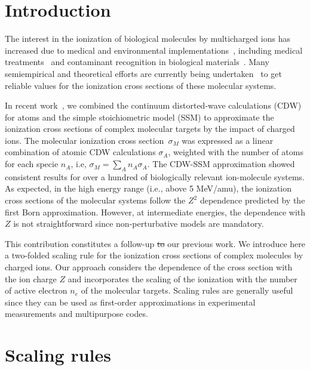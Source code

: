 \documentclass[10pt,showpacs,showkeys,twocolumn]{revtex4-1}
\providecommand{\DIFadd}[1]{{\protect\color{blue}\uwave{#1}}} %
\providecommand{\DIFdel}[1]{{\protect\color{red}\sout{#1}}}                      %
\providecommand{\DIFaddbegin}{} %
\providecommand{\DIFaddend}{} %
\providecommand{\DIFdelbegin}{} %
\providecommand{\DIFdelend}{} %
\newcommand{\DIFscaledelfig}{0.5}
\newlength{\DIFdelgraphicswidth} %
\newlength{\DIFdelgraphicsheight} %
\newcommand{\DIFaddincludegraphics}[2][]{{\color{blue}\fbox{\DIFOincludegraphics[#1]{#2}}}} %
\newcommand{\DIFdelincludegraphics}[2][]{%
\sbox{\DIFdelgraphicsbox}{\DIFOincludegraphics[#1]{#2}}%
\settoboxwidth{\DIFdelgraphicswidth}{\DIFdelgraphicsbox} %
\settoboxtotalheight{\DIFdelgraphicsheight}{\DIFdelgraphicsbox} %
\scalebox{\DIFscaledelfig}{%
\parbox[b]{\DIFdelgraphicswidth}{\usebox{\DIFdelgraphicsbox}\\[-\baselineskip] \rule{\DIFdelgraphicswidth}{0em}}\llap{\resizebox{\DIFdelgraphicswidth}{\DIFdelgraphicsheight}{%
\setlength{\unitlength}{\DIFdelgraphicswidth}%
\begin{picture}(1,1)%
\thicklines\linethickness{2pt} %
{\color[rgb]{1,0,0}\put(0,0){\framebox(1,1){}}}%
{\color[rgb]{1,0,0}\put(0,0){\line( 1,1){1}}}%
{\color[rgb]{1,0,0}\put(0,1){\line(1,-1){1}}}%
\end{picture}%
}\hspace*{3pt}}} %
} %
\DeclareRobustCommand{\DIFaddbegin}{\DIFOaddbegin \let\includegraphics\DIFaddincludegraphics} %
\DeclareRobustCommand{\DIFaddend}{\DIFOaddend \let\includegraphics\DIFOincludegraphics} %
\DeclareRobustCommand{\DIFdelbegin}{\DIFOdelbegin \let\includegraphics\DIFdelincludegraphics} %
\DeclareRobustCommand{\DIFdelend}{\DIFOaddend \let\includegraphics\DIFOincludegraphics} %
\begin{document}
\section{Introduction}

The interest in the ionization of biological molecules by 
multicharged ions has increased due to medical and environmental
implementations~\cite{PhysMed}, including medical 
treatments~\cite{Mohamad2017,Solov2009,Denifl2011} and contaminant 
recognition in biological materials~\cite{water,ferrazdias}. 
Many semiempirical \citep{vera_prl2013} and theoretical efforts are 
currently being undertaken~\cite{MendezJPB20,Quinto20,ludde2019,
ludde2018,ludde2016,Champion2012} to get reliable values for the 
ionization cross sections of these molecular systems. 

In recent work~\cite{MendezJPB20}, we combined the continuum 
distorted-wave calculations (CDW) for atoms and the simple 
stoichiometric model (SSM) to approximate the ionization cross 
sections of complex molecular targets by the impact of charged ions. 
The molecular ionization cross section~$\sigma_M$ was expressed as 
a linear combination of atomic CDW calculations $\sigma_A$, 
weighted with the number of atoms for each specie $n_A$, i.e, 
$\sigma_M=\sum_A n_A \sigma_A$. The CDW-SSM approximation showed 
consistent results for over a hundred of biologically relevant 
ion-molecule systems. As expected, in the high energy range (i.e., 
above 5 MeV/amu), the ionization cross sections of 
the molecular systems follow the $Z^2$ dependence predicted by the 
first Born approximation. However, at intermediate 
energies, the dependence with $Z$ is not straightforward since 
non-perturbative models are mandatory.

This contribution constitutes a follow-up \DIFdelbegin \DIFdel{to }\DIFdelend \DIFaddbegin \DIFadd{of }\DIFaddend our previous work\DIFaddbegin \DIFadd{~\mbox{%
\cite{MendezJPB20}}\hspace{0pt}%
}\DIFaddend . We 
introduce here a two-folded scaling rule for the ionization cross 
sections of complex molecules by charged ions. Our approach considers 
the dependence of the cross section with the ion charge $Z$ 
and incorporates the scaling of the ionization with the number of 
active electron $n_e$ of the molecular targets. Scaling rules are 
generally \DIFaddbegin \DIFadd{very }\DIFaddend useful since they can be used as first-order 
approximations in experimental measurements and multipurpose codes. 

\section{Scaling rules}
\end{document}
